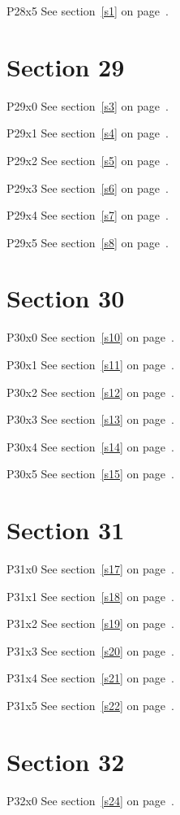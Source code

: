 P28x5 \w\w\w\w\w\w See section~\ref{s1} on page~\pageref{s9}.

\section{Section 29}\label{s29}
P29x0 \w\w\w\w\w\w See section~\ref{s3} on page~\pageref{s7}.

P29x1 \w\w\w\w\w\w See section~\ref{s4} on page~\pageref{s8}.

P29x2 \w\w\w\w\w\w See section~\ref{s5} on page~\pageref{s9}.

P29x3 \w\w\w\w\w\w See section~\ref{s6} on page~\pageref{s10}.

P29x4 \w\w\w\w\w\w See section~\ref{s7} on page~\pageref{s11}.

P29x5 \w\w\w\w\w\w See section~\ref{s8} on page~\pageref{s12}.

\section{Section 30}\label{s30}
P30x0 \w\w\w\w\w\w See section~\ref{s10} on page~\pageref{s10}.

P30x1 \w\w\w\w\w\w See section~\ref{s11} on page~\pageref{s11}.

P30x2 \w\w\w\w\w\w See section~\ref{s12} on page~\pageref{s12}.

P30x3 \w\w\w\w\w\w See section~\ref{s13} on page~\pageref{s13}.

P30x4 \w\w\w\w\w\w See section~\ref{s14} on page~\pageref{s14}.

P30x5 \w\w\w\w\w\w See section~\ref{s15} on page~\pageref{s15}.

\section{Section 31}\label{s31}
P31x0 \w\w\w\w\w\w See section~\ref{s17} on page~\pageref{s13}.

P31x1 \w\w\w\w\w\w See section~\ref{s18} on page~\pageref{s14}.

P31x2 \w\w\w\w\w\w See section~\ref{s19} on page~\pageref{s15}.

P31x3 \w\w\w\w\w\w See section~\ref{s20} on page~\pageref{s16}.

P31x4 \w\w\w\w\w\w See section~\ref{s21} on page~\pageref{s17}.

P31x5 \w\w\w\w\w\w See section~\ref{s22} on page~\pageref{s18}.

\section{Section 32}\label{s32}
P32x0 \w\w\w\w\w\w See section~\ref{s24} on page~\pageref{s16}.

